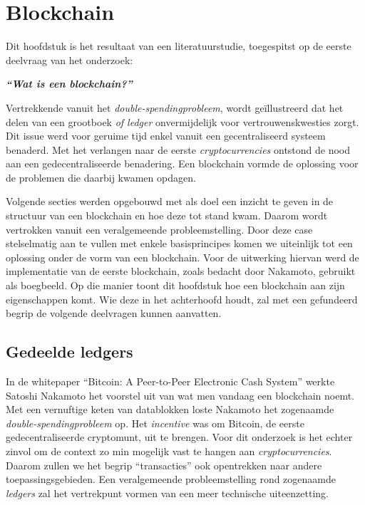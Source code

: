 \chapter{Blockchain}
\label{ch:blockchain}


Dit hoofdstuk is het resultaat van een literatuurstudie, toegespitst op de eerste deelvraag van het onderzoek:
\begin{center}
	\textit{\textbf{``Wat is een blockchain?''}}
\end{center}
Vertrekkende vanuit het \textit{double-spendingprobleem}, wordt geïllustreerd dat het delen van een grootboek \textit{of ledger} onvermijdelijk voor vertrouwenskwesties zorgt. Dit issue werd voor geruime tijd enkel vanuit een gecentraliseerd systeem benaderd. Met het verlangen naar de eerste \textit{cryptocurrencies} ontstond de nood aan een gedecentraliseerde benadering. Een blockchain vormde de oplossing voor de problemen die daarbij kwamen opdagen.

Volgende secties werden opgebouwd met als doel een inzicht te geven in de structuur van een blockchain en hoe deze tot stand kwam. Daarom wordt vertrokken vanuit een veralgemeende probleemstelling. Door deze case stelselmatig aan te vullen met enkele basisprincipes komen we uiteinlijk tot een oplossing onder de vorm van een blockchain. Voor de uitwerking hiervan werd de implementatie van de eerste blockchain, zoals bedacht door Nakamoto, gebruikt als boegbeeld. Op die manier toont dit hoofdstuk hoe een blockchain aan zijn eigenschappen komt. Wie deze in het achterhoofd houdt, zal met een gefundeerd begrip de volgende deelvragen kunnen aanvatten.


\section{Gedeelde ledgers}
\label{sec:gedeelde-ledgers}
In de whitepaper ``Bitcoin: A Peer-to-Peer Electronic Cash System'' werkte Satoshi Nakamoto het voorstel uit van wat men vandaag een blockchain noemt. Met een vernuftige keten van datablokken loste Nakamoto het zogenaamde \textit{double-spendingprobleem} op. Het \textit{incentive} was om Bitcoin, de eerste gedecentraliseerde cryptomunt, uit te brengen. Voor dit onderzoek is het echter zinvol om de context zo min mogelijk vast te hangen aan \textit{cryptocurrencies}. Daarom zullen we het begrip ``transacties'' ook opentrekken naar andere toepassingsgebieden. Een veralgemeende probleemstelling rond zogenaamde \textit{ledgers} zal het vertrekpunt vormen van een meer technische uiteenzetting.


